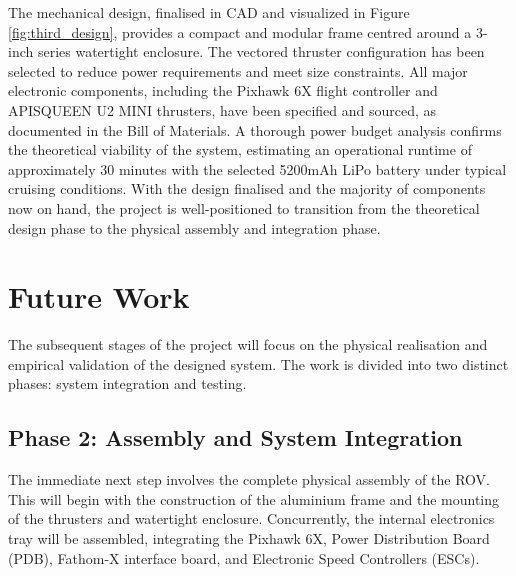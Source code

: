 \documentclass[11pt, a4paper]{article}
\begin{document}
The mechanical design, finalised in CAD and visualized in Figure \ref{fig:third_design}, provides a compact and modular frame centred around a 3-inch series watertight enclosure. The vectored thruster configuration has been selected to reduce power requirements and meet size constraints. All major electronic components, including the Pixhawk 6X flight controller and APISQUEEN U2 MINI thrusters, have been specified and sourced, as documented in the Bill of Materials. A thorough power budget analysis confirms the theoretical viability of the system, estimating an operational runtime of approximately 30 minutes with the selected 5200mAh LiPo battery under typical cruising conditions. With the design finalised and the majority of components now on hand, the project is well-positioned to transition from the theoretical design phase to the physical assembly and integration phase.

\section{Future Work}
\label{sec:future_work}

The subsequent stages of the project will focus on the physical realisation and empirical validation of the designed system. The work is divided into two distinct phases: system integration and testing.

\subsection{Phase 2: Assembly and System Integration}
The immediate next step involves the complete physical assembly of the ROV. This will begin with the construction of the aluminium frame and the mounting of the thrusters and watertight enclosure. Concurrently, the internal electronics tray will be assembled, integrating the Pixhawk 6X, Power Distribution Board (PDB), Fathom-X interface board, and Electronic Speed Controllers (ESCs).
\end{document}

